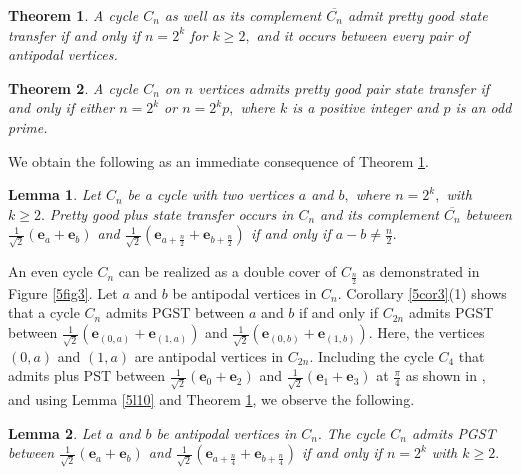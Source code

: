 \documentclass[12pt,a4paper]{article}
\newtheorem{thm}{Theorem}
\newtheorem{lem}{Lemma}
\def \e {{\bf e}}
\def \e {{\mathbf e}}
\newcommand{\ob}[1]{\left(#1\right)}
\begin{document}
\begin{thm}\cite{pal4}\label{5t24} A cycle $C_n$ as well as its complement $\overline{C_n}$ admit pretty good state transfer
if and only if $n=2^k$ for $k\geq 2,$ and it occurs between every pair of antipodal vertices.
\end{thm}

\begin{thm}\cite{pal10}\label{5th25}
 A cycle $C_n$ on $n$ vertices admits pretty good pair state transfer if and only
if either $n = 2^k$ or $n = 2^kp,$ where $k$ is a positive integer and $p$ is an odd prime.
\end{thm}
We obtain the following as an immediate consequence of Theorem \ref{5t24}.
\begin{lem}\label{5t26}
Let $C_n$ be a cycle with two vertices $a$ and
$b,$ where $n=2^k,$ with $k\geq 2.$ Pretty good plus state transfer occurs in $C_n$ and its complement $\overline{C_n}$ between $\frac{1}{\sqrt{2}}\ob{\e_a+\e_b}$ and $\frac{1}{\sqrt{2}}\ob{\e_{a+\frac{n}{2}}+\e_{b+\frac{n}{2}}}$ if and only
if $a-b\neq \frac{n}{2}.$
\end{lem}
An even cycle $C_n$ can be realized as a double cover of $C_{\frac{n}{2}}$ as demonstrated in Figure \ref{5fig3}. Let $a$ and $b$ be antipodal vertices in $C_n.$ Corollary \ref{5cor3}(1) shows that a cycle $C_n$ admits PGST between $a$ and $b$ if and only if $C_{2n}$ admits PGST between $\frac{1}{\sqrt{2}}\ob{\e_{(0,a)}+\e_{(1,a)}}$ and $\frac{1}{\sqrt{2}}\ob{\e_{(0,b)}+\e_{(1,b)}}.$ Here, the vertices $(0,a)$ and $(1,a)$ are antipodal vertices in $C_{2n}.$ Including the cycle $C_4$ that admits plus PST between $\frac{1}{\sqrt{2}}\ob{\e_0+\e_2}$ and $\frac{1}{\sqrt{2}}\ob{\e_1+\e_3}$ at $\frac{\pi}{4}$ as shown in \cite[Theorem 6.5]{kim}, and using Lemma \ref{5l10} and Theorem \ref{5t24}, we observe the following.

\begin{lem}\label{5lemma5}
    Let $a$ and $b$ be antipodal vertices in $C_n.$ The cycle $C_n$ admits PGST between $\frac{1}{\sqrt{2}}\ob{\e_a+\e_b}$ and $\frac{1}{\sqrt{2}}\ob{\e_{a+\frac{n}{4}}+\e_{b+\frac{n}{4}}}$ if and only if $n=2^k$ with $k\geq 2.$ 
\end{lem}
\end{document}
